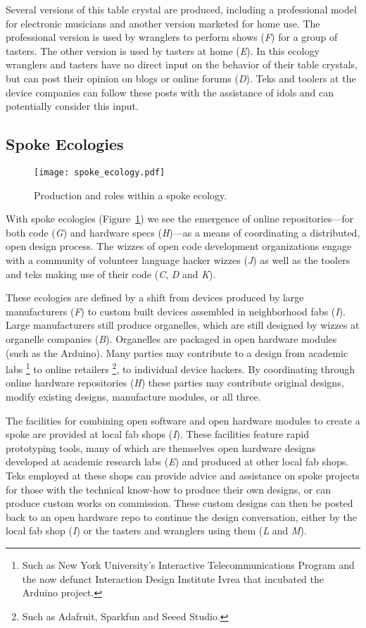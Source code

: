 Several versions of this table crystal are produced, including a professional model for electronic musicians and another version marketed for home use. The professional version is used by wranglers to perform shows (\emph{F}) for a group of tasters. The other version is used by tasters at home (\emph{E}). In this ecology wranglers and tasters have no direct input on the behavior of their table crystals, but can post their opinion on blogs or online forums (\emph{D}). Teks and toolers at the device companies can follow these posts with the assistance of idols and can potentially consider this input.

\subsection{Spoke Ecologies}
%
\begin{figure}[b!]
  \centering
    \texttt{[image: spoke\_ecology.pdf]}
  \caption{Production and roles within a spoke ecology.}
  \label{fig:spoke_ecology}
\end{figure}
%
With spoke ecologies  (Figure~\ref{fig:spoke_ecology}) we see the emergence of online repositories---for both code (\emph{G}) and hardware specs (\emph{H})---as a means of coordinating a distributed, open design process. The wizzes of open code development organizations engage with a community of volunteer language hacker wizzes (\emph{J}) as well as the toolers and teks making use of their code (\emph{C}, \emph{D} and \emph{K}).

These ecologies are defined by a shift from devices produced by large manufacturers (\emph{F}) to custom built devices assembled in neighborhood fabs (\emph{I}). 
Large manufacturers still produce organelles, which are still designed by wizzes at organelle companies (\emph{B}). Organelles are packaged in open hardware modules (such as the Arduino). 
Many parties may contribute to a design from academic labs%
\footnote{Such as New York University's Interactive Telecommunications Program  and the now defunct Interaction Design Institute Ivrea that incubated the Arduino project.}
to online retailers%
\footnote{Such as Adafruit, Sparkfun and Seeed Studio.},
to individual device hackers.
By coordinating through online hardware repositories (\emph{H}) these parties may contribute original designs, modify existing designs, manufacture modules, or all three.

The facilities for combining open software and open hardware modules to create a spoke are provided at local fab shops (\emph{I}).
These facilities feature rapid prototyping tools, many of which are themselves open hardware designs developed at academic research labs (\emph{E}) and produced at other local fab shops.
Teks employed at these shops can provide advice and assistance on spoke projects for those with the technical know-how to produce their own designs, or can produce custom works on commission. 
These custom designs can then be posted back to an open hardware repo to continue the design conversation, either by the local fab shop (\emph{I}) or the tasters and wranglers using them (\emph{L} and \emph{M}).

